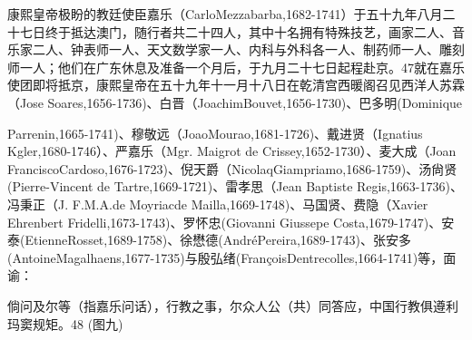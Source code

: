 康熙皇帝极盼的教廷使臣嘉乐（CarloMezzabarba,1682-1741）于五十九年八月二十七日终于抵达澳门，随行者共二十四人，其中十名拥有特殊技艺，画家二人、音乐家二人、钟表师一人、天文数学家一人、内科与外科各一人、制药师一人、雕刻师一人；他们在广东休息及准备一个月后，于九月二十七日起程赴京。47就在嘉乐使团即将抵京，康熙皇帝在五十九年十一月十八日在乾清宫西暖阁召见西洋人苏霖（Jose Soares,1656-1736)、白晋（JoachimBouvet,1656-1730)、巴多明(Dominique

\vfill
\begin{BookNotes}
\end{BookNotes}


\noindent Parrenin,1665-1741)、穆敬远（JoaoMourao,1681-1726)、戴进贤（Ignatius Kgler,1680-1746）、严嘉乐（Mgr. Maigrot de Crissey,1652-1730）、麦大成（Joan FranciscoCardoso,1676-1723)、倪天爵（NicolaqGiampriamo,1686-1759)、汤尙贤(Pierre-Vincent de Tartre,1669-1721)、雷孝思（Jean Baptiste Regis,1663-1736)、冯秉正（J. F.M.A.de Moyriacde Mailla,1669-1748)、马国贤、费隐（Xavier Ehrenbert Fridelli,1673-1743)、罗怀忠(Giovanni Giussepe Costa,1679-1747)、安泰(EtienneRosset,1689-1758)、徐懋德(AndréPereira,1689-1743)、张安多(AntoineMagalhaens,1677-1735)与殷弘绪(FrançoisDentrecolles,1664-1741)等，面谕：

\begin{BookQuote}
倘问及尔等（指嘉乐问话），行教之事，尔众人公（共）同答应，中国行教俱遵利玛窦规矩。48 (图九)
\end{BookQuote}

\vfill
\begin{BookNotes}
\end{BookNotes}


